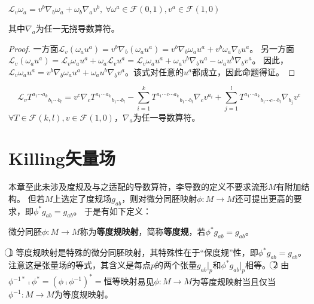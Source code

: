 \begin{theorem}
$\mathscr{L}_v\omega_a = v^b\nabla_b\omega_a + \omega_b\nabla_av^b, ~ \forall \omega^a \in \mathscr{F}(0, 1), v^a \in \mathscr{F}(1, 0)$

其中$\nabla_a$为任一无挠导数算符。
\end{theorem}

\begin{proof}
一方面$\mathscr{L}_v(\omega_au^a) = v^b\nabla_b(\omega_au^a) = v^b\nabla_b\omega_au^a + v^b\omega_a\nabla_bu^a$。
另一方面$\mathscr{L}_v(\omega_au^a) = \mathscr{L}_v\omega_au^a + \omega_a\mathscr{L}_vu^a = \mathscr{L}_v\omega_au^a + \omega_av^b\nabla_bu^a - \omega_au^b\nabla_bv^a$。
因此，$\mathscr{L}_v\omega_au^a = v^b\nabla_b\omega_au^a + \omega_au^b\nabla_bv^a$。该式对任意的$u^a$都成立，因此命题得证。
\end{proof}

\begin{theorem}
$$\mathscr{L}_vT^{a_1 \cdots a_k}{}_{b_1 \cdots b_l} = v^c\nabla_cT^{a_1 \cdots a_k}{}_{b_1 \cdots b_l} - \sum^k_{i = 1}T^{a_1 \cdots c \cdots a_k}{}_{b_1 \cdots b_l}\nabla_cv^{a_i} + \sum^l_{j = 1}T^{a_1 \cdots a_k}{}_{b_1 \cdots c \cdots b_l}\nabla_{b_j}v^c$$
$\forall T \in \mathscr{F}(k, l), v \in \mathscr{F}(1, 0)$，$\nabla_a$为任一导数算符。
\end{theorem}

\section{Killing矢量场}

本章至此未涉及度规及与之适配的导数算符，李导数的定义不要求流形$M$有附加结构。
但若$M$上选定了度规场$g_{ab}$，则对微分同胚映射$\phi \colon M \to M$还可提出更高的要求，即$\phi^*g_{ab} = g_{ab}$。
于是有如下定义：

\begin{definition}
微分同胚$\phi \colon M \to M$称为\textbf{等度规映射}，简称\textbf{等度规}，若$\phi^*g_{ab} = g_{ab}$。
\end{definition}

\begin{note}
\textcircled{1} 等度规映射是特殊的微分同胚映射，其特殊性在于``保度规''性，即$\phi^*g_{ab} = g_{ab}$。
注意这是张量场的等式，其含义是每点$p$的两个张量$g_{ab}|_p$和$\phi^*g_{ab}|_p$相等。
\textcircled{2} 由$\phi^{-1*} \comp \phi^* = (\phi \comp \phi^{-1})^* = \text{恒等映射}$易见$\phi \colon M \to M$为等度规映射当且仅当$\phi^{-1} \colon M \to M$为等度规映射。
\end{note}

